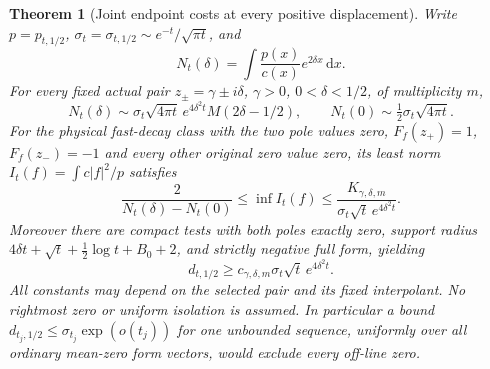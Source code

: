 \documentclass[11pt]{article}
\newtheorem{theorem}{Theorem}
\theoremstyle{remark}\newtheorem{remark}[theorem]{Remark}
\newcommand{\dd}{\,\mathrm d}
\begin{document}
\begin{theorem}[Joint endpoint costs at every positive displacement]
\label{thm:endpoint-detection-cost}
Write $p=p_{t,1/2}$, $\sigma_t=\sigma_{t,1/2}
\sim e^{-t}/\sqrt{\pi t}$, and
\[
 N_t(\delta)=\int\frac{p(x)}{c(x)}e^{2\delta x}\dd x .
\]
For every fixed actual pair $z_\pm=\gamma\pm i\delta$,
$\gamma>0$, $0<\delta<1/2$, of multiplicity $m$,
\[
 N_t(\delta)\sim\sigma_t\sqrt{4\pi t}\,
              e^{4\delta^2t}M(2\delta-1/2),\qquad
 N_t(0)\sim\tfrac12\sigma_t\sqrt{4\pi t}.           \tag{EHC1}
\]
For the physical fast-decay class with the two pole values
zero, $F_f(z_+)=1$, $F_f(z_-)=-1$ and every other original
zero value zero, its least norm $I_t(f)=\int c|f|^2/p$ satisfies
\[
 \frac2{N_t(\delta)-N_t(0)}
 \le\inf I_t(f)\le
       \frac{K_{\gamma,\delta,m}}
                  {\sigma_t\sqrt t\,e^{4\delta^2t}}. \tag{EHC2}
\]
Moreover there are compact tests with both poles exactly
zero, support radius
$4\delta t+\sqrt t+\tfrac12\log t+B_0+2$, and strictly
negative full form, yielding
\[
 d_{t,1/2}\ge c_{\gamma,\delta,m}
                     \sigma_t\sqrt t\,e^{4\delta^2t}. \tag{EHC3}
\]
All constants may depend on the selected pair and its fixed
interpolant. No rightmost zero or uniform isolation is assumed.
In particular a bound
$d_{t_j,1/2}\le\sigma_{t_j}\exp(o(t_j))$ for one unbounded
sequence, uniformly over all ordinary mean-zero form vectors,
would exclude every off-line zero.
\end{theorem}
\end{document}
